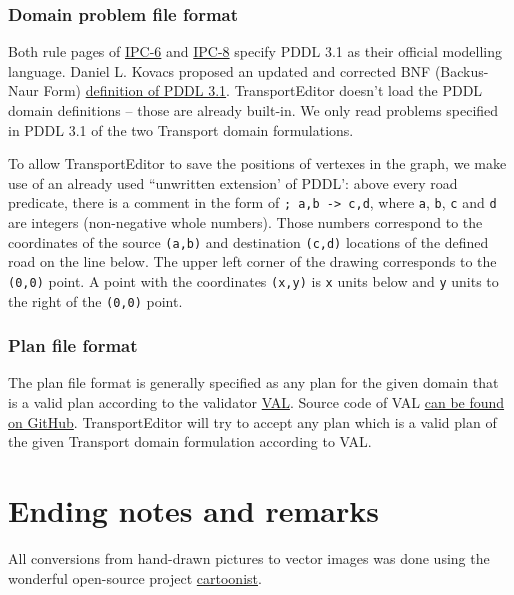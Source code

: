 \documentclass[10pt,a4paper,oneside]{article}
\newcommand{\TODO}[1]{{\textbf{TODO:} #1}} %
\newcommand{\pname}{TransportEditor} %
\begin{document}
\subsubsection{Domain problem file format}\label{problem-format}

Both rule pages of \href{http://icaps-conference.org/ipc2008/deterministic/CompetitionRules.html}{IPC-6}
and \href{https://helios.hud.ac.uk/scommv/IPC-14/rules.html}{IPC-8}
specify PDDL 3.1 as their official modelling language. Daniel L. Kovacs proposed an updated and corrected BNF (Backus-Naur Form)
\href{https://helios.hud.ac.uk/scommv/IPC-14/repository/kovacs-pddl-3.1-2011.pdf}{definition of PDDL 3.1}.
\pname{} doesn't load the PDDL domain definitions -- those are already built-in. We only read problems specified in PDDL 3.1 of the two Transport domain formulations.

To allow \pname{} to save the positions of vertexes in the graph, we make use of an already used ``unwritten extension' of PDDL':
above every road predicate, there is a comment in the form of \verb+; a,b -> c,d+,
where \verb+a+, \verb+b+, \verb+c+ and \verb+d+ are integers (non-negative whole numbers).
Those numbers correspond to the coordinates of the source \verb+(a,b)+ and destination \verb+(c,d)+ locations of the defined road on the line below. The upper left corner of the drawing corresponds to the \verb+(0,0)+ point. A point with the coordinates \verb+(x,y)+ is \verb+x+ units below and \verb+y+ units to the right of the \verb+(0,0)+ point.

\subsubsection{Plan file format}\label{plan-format}

The plan file format is generally specified as any plan for the given domain that is a valid plan according to the validator \href{http://www.inf.kcl.ac.uk/research/groups/PLANNING/index.php?option=com_content&view=article&id=70&Itemid=77}{VAL}. Source code of VAL \href{https://github.com/KCL-Planning/VAL}{can be found on GitHub}. \pname{} will try to accept any plan which is a valid plan of the given Transport domain formulation according to VAL.

\section{Ending notes and remarks}

All conversions from hand-drawn pictures to vector images was done using the wonderful
open-source project \href{https://github.com/honzajavorek/cartoonist}{cartoonist}.





{
\footnotesize %
%
}
\end{document}
